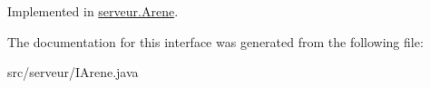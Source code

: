 Implemented in \hyperlink{classserveur_1_1_arene_a1b8ef284b2fae162ba68884bfbe0160a}{serveur.\-Arene}.



The documentation for this interface was generated from the following file\-:\begin{DoxyCompactItemize}
\item 
src/serveur/I\-Arene.\-java\end{DoxyCompactItemize}
